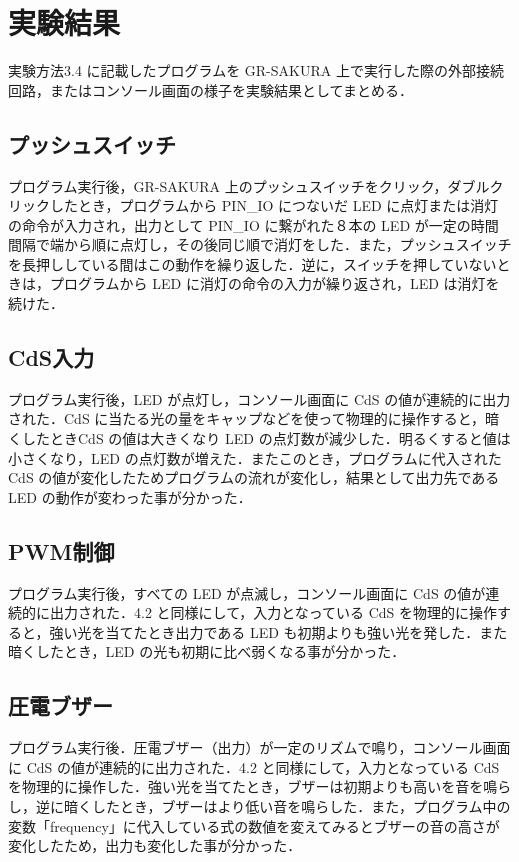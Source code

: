 \documentclass {ujarticle}
\begin{document}
 \section{実験結果}
 実験方法3.4 に記載したプログラムを GR-SAKURA 上で実行した際の外部接続回路，またはコンソール画面の様子を実験結果としてまとめる．
 \subsection{プッシュスイッチ}
 プログラム実行後，GR-SAKURA 上のプッシュスイッチをクリック，ダブルクリックしたとき，プログラムから PIN\_IO につないだ LED に点灯または消灯の命令が入力され，出力として PIN\_IO に繋がれた８本の LED が一定の時間間隔で端から順に点灯し，その後同じ順で消灯をした．また，プッシュスイッチを長押ししている間はこの動作を繰り返した．逆に，スイッチを押していないときは，プログラムから LED に消灯の命令の入力が繰り返され，LED は消灯を続けた．
 
\subsection{CdS入力}
プログラム実行後，LED が点灯し，コンソール画面に CdS の値が連続的に出力された．CdS に当たる光の量をキャップなどを使って物理的に操作すると，暗くしたときCdS の値は大きくなり LED の点灯数が減少した．明るくすると値は小さくなり，LED の点灯数が増えた．またこのとき，プログラムに代入された CdS の値が変化したためプログラムの流れが変化し，結果として出力先である LED の動作が変わった事が分かった．

\subsection{PWM制御}
 プログラム実行後，すべての LED が点滅し，コンソール画面に CdS の値が連続的に出力された．4.2 と同様にして，入力となっている CdS を物理的に操作すると，強い光を当てたとき出力である LED も初期よりも強い光を発した．また暗くしたとき，LED の光も初期に比べ弱くなる事が分かった．
 
 \subsection{圧電ブザー}
 プログラム実行後．圧電ブザー（出力）が一定のリズムで鳴り，コンソール画面に CdS の値が連続的に出力された．4.2 と同様にして，入力となっている CdS を物理的に操作した．強い光を当てたとき，ブザーは初期よりも高いを音を鳴らし，逆に暗くしたとき，ブザーはより低い音を鳴らした．また，プログラム中の変数「frequency」に代入している式の数値を変えてみるとブザーの音の高さが変化したため，出力も変化した事が分かった．
 
\end{document}

